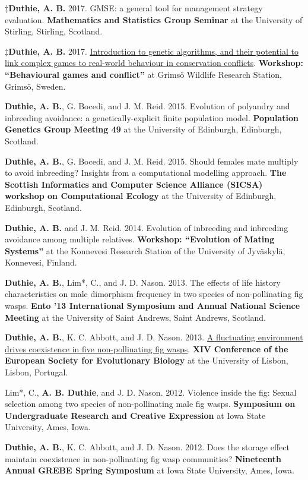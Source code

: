 \documentclass[letterpaper]{article}
\renewenvironment{itemize}{
  \begin{list}{}{
    \setlength{\leftmargin}{1.5em}
  }
}{
  \end{list}
}
\begin{document}
\begin{itemize}
\item $\ddagger${\bf Duthie, A. B.} 2017. GMSE: a general tool for management strategy evaluation. {\bf Mathematics and Statistics Group Seminar} at the University of Stirling, Stirling, Scotland.
\item $\ddagger${\bf Duthie, A. B.} 2017. \href{https://bradduthie.shinyapps.io/GRIMSO}{Introduction to genetic algorithms, and their potential to link complex games to real-world behaviour in conservation conflicts}. {\bf Workshop: ``Behavioural games and conflict''} at Grims\"{o} Wildlife Research Station, Grims\"{o}, Sweden.
\item {\bf Duthie, A. B.}, G. Bocedi, and J. M. Reid. 2015. Evolution of polyandry and inbreeding avoidance: a genetically-explicit finite population model. {\bf Population Genetics Group Meeting 49} at the University of Edinburgh, Edinburgh, Scotland.
\item {\bf Duthie, A. B.}, G. Bocedi, and J. M. Reid. 2015. Should females mate multiply to avoid inbreeding? Insights from a computational modelling approach. {\bf The Scottish Informatics and Computer Science Alliance (SICSA) workshop on Computational Ecology} at the University of Edinburgh, Edinburgh, Scotland.
\item {\bf Duthie, A. B.} and J. M. Reid. 2014. Evolution of inbreeding and inbreeding avoidance among multiple relatives. {\bf Workshop: ``Evolution of Mating Systems''} at the Konnevesi Research Station of the University of Jyv\"{a}skyl\"{a}, Konnevesi, Finland.
\item {\bf Duthie, A. B.}, Lim*, C., and J. D. Nason. 2013. The effects of life history characteristics on male dimorphism frequency in two species of non-pollinating fig wasps. {\bf Ento '13 International Symposium and Annual National Science Meeting} at the University of Saint Andrews, Saint Andrews, Scotland.
\item {\bf Duthie, A. B.}, K. C. Abbott, and J. D. Nason. 2013. \href{https://www.youtube.com/watch?v=8Oi48FdaLXY}{A fluctuating environment drives coexistence in five non-pollinating fig wasps}. {\bf XIV Conference of the European Society for Evolutionary Biology} at the University of Lisbon, Lisbon, Portugal.
\item Lim*, C., {\bf A. B. Duthie}, and J. D. Nason. 2012. Violence inside the fig: Sexual selection among two species of non-pollinating male fig wasps. {\bf Symposium on Undergraduate Research and Creative Expression} at Iowa State University, Ames, Iowa.
\item {\bf Duthie, A. B.}, K. C. Abbott, and J. D. Nason. 2012. Does the storage effect maintain coexistence in non-pollinating fig wasp communities? {\bf Nineteenth Annual GREBE Spring Symposium} at Iowa State University, Ames, Iowa.

\end{itemize}
\end{document}
